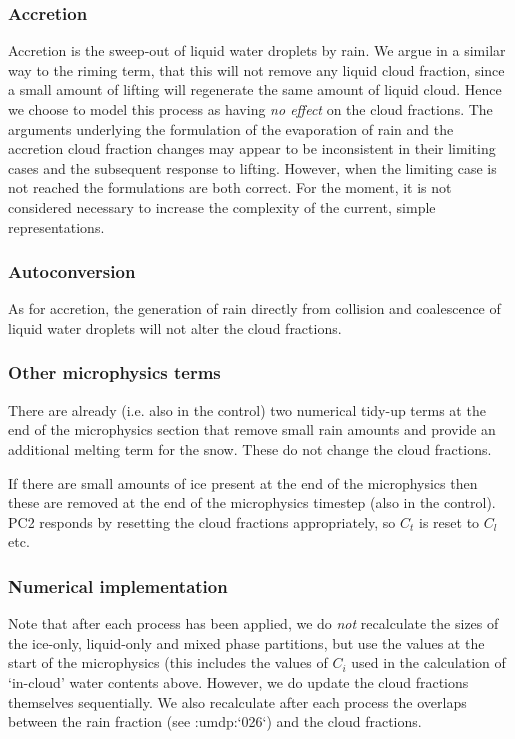 \documentclass{UMDP_article}
\newcommand{\citeumdp}[1]{:umdp:`#1`}
\begin{document}
\subsubsection{Accretion}
Accretion is the sweep-out of liquid water droplets by rain. We argue
in a similar way to the riming term, that this will not remove any liquid
cloud fraction, since a small amount of lifting will regenerate the same
amount of liquid cloud. Hence we choose to model this process as having
\textit{no effect} on the cloud fractions. The arguments underlying the
formulation of the evaporation of rain and the accretion cloud fraction
changes may appear to be inconsistent in their limiting cases and the
subsequent response to lifting. However, when the limiting case is
not reached the formulations are both correct. For the moment, it is
not considered necessary to increase the complexity of the current,
simple representations.

\subsubsection{Autoconversion}
As for accretion, the generation of rain directly from collision
and coalescence of liquid water droplets will not alter the cloud fractions.

\subsubsection{Other microphysics terms}
There are already (i.e. also in the control)
two numerical tidy-up terms at the end of the microphysics
section that remove small rain amounts and provide an additional
melting term for the snow. These do not change the cloud fractions.

If there are small amounts of ice present at the end of the
microphysics then these are removed at the end of the microphysics
timestep (also in the control). PC2 responds by resetting the
cloud fractions appropriately, so $C_t$ is reset to $C_l$ etc.

\subsubsection{Numerical implementation}

Note that after each process has been applied, we do \textit{not}
recalculate the sizes of the ice-only, liquid-only and mixed phase
partitions, but use the values at the start of the microphysics (this
includes the values of $C_i$ used in the calculation of `in-cloud'
water contents above. However, we do update the cloud fractions
themselves sequentially. We also recalculate after each process
the overlaps between the rain fraction (see \citeumdp{026}) and the cloud fractions.
\end{document}

